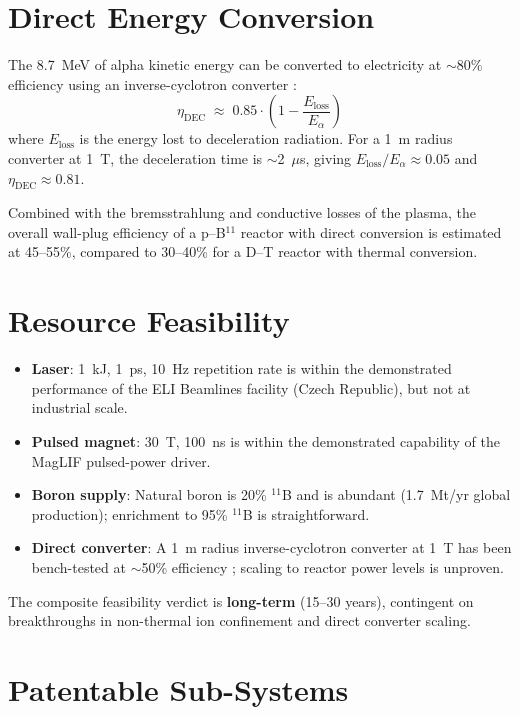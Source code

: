 \documentclass[11pt]{article}
\begin{document}
\section{Direct Energy Conversion}

The 8.7~MeV of alpha kinetic energy can be converted to electricity
at $\sim$80\% efficiency using an inverse-cyclotron converter
\cite{miley2014}:
\begin{equation}
  \eta_\text{DEC} \;\approx\; 0.85 \cdot \left(1 - \frac{E_\text{loss}}{E_\alpha}\right)
\end{equation}
where $E_\text{loss}$ is the energy lost to deceleration radiation.
For a 1~m radius converter at 1~T, the deceleration time is
$\sim$2~$\mu$s, giving $E_\text{loss}/E_\alpha \approx 0.05$ and
$\eta_\text{DEC} \approx 0.81$.

Combined with the bremsstrahlung and conductive losses of the
plasma, the overall wall-plug efficiency of a p--B$^{11}$ reactor
with direct conversion is estimated at 45--55\%, compared to
30--40\% for a D--T reactor with thermal conversion.

\section{Resource Feasibility}

\begin{itemize}
\item \textbf{Laser}: 1~kJ, 1~ps, 10~Hz repetition rate is within
the demonstrated performance of the ELI Beamlines facility (Czech
Republic), but not at industrial scale.
\item \textbf{Pulsed magnet}: 30~T, 100~ns is within the demonstrated
capability of the MagLIF pulsed-power driver.
\item \textbf{Boron supply}: Natural boron is 20\% $^{11}$B and is
abundant (1.7~Mt/yr global production); enrichment to 95\% $^{11}$B
is straightforward.
\item \textbf{Direct converter}: A 1~m radius inverse-cyclotron
converter at 1~T has been bench-tested at $\sim$50\% efficiency
\cite{miley2014}; scaling to reactor power levels is unproven.
\end{itemize}

The composite feasibility verdict is \textbf{long-term} (15--30 years),
contingent on breakthroughs in non-thermal ion confinement and direct
converter scaling.

\section{Patentable Sub-Systems}
\end{document}
